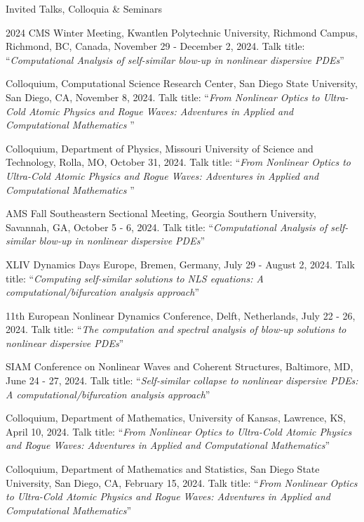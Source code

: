 \documentclass[10pt]{article} %
\begin{document}
\begin{section}{Invited Talks, Colloquia \& Seminars}
\begin{etaremune}
\item 2024 CMS Winter Meeting, Kwantlen Polytechnic University, Richmond Campus, Richmond, BC, Canada, November 29 - December 2, 2024.
Talk title: ``\textit{Computational Analysis of self-similar blow-up in nonlinear dispersive PDEs}''

\item Colloquium, Computational Science Research Center, San Diego State University, San Diego, CA, November 8, 2024.
Talk title: ``\textit{From Nonlinear Optics to Ultra-Cold Atomic Physics and Rogue Waves: Adventures in Applied and Computational Mathematics
}''

\item Colloquium, Department of Physics, Missouri University of Science and Technology, Rolla, MO, October 31, 2024.
Talk title: ``\textit{From Nonlinear Optics to Ultra-Cold Atomic Physics and Rogue Waves: Adventures in Applied and Computational Mathematics
}''

\item AMS Fall Southeastern Sectional Meeting, Georgia Southern University, Savannah, GA, October 5 - 6, 2024.
Talk title: ``\textit{Computational Analysis of self-similar blow-up in nonlinear dispersive PDEs}''

\item XLIV Dynamics Days Europe, Bremen, Germany, July 29 - August 2, 2024.
Talk title: ``\textit{Computing self-similar solutions to NLS equations: A computational/bifurcation analysis approach}''

\item 11th European Nonlinear Dynamics Conference, Delft, Netherlands, July 22 - 26, 2024.
Talk title: ``\textit{The computation and spectral analysis of blow-up solutions to nonlinear dispersive PDEs}''

\item SIAM Conference on Nonlinear Waves and Coherent Structures, Baltimore, MD, June 24 - 27, 2024.
Talk title: ``\textit{Self-similar collapse to nonlinear dispersive PDEs: A computational/bifurcation analysis approach}''

\item Colloquium, Department of Mathematics, University of Kansas, Lawrence, KS, April 10, 2024.
Talk title: ``\textit{From Nonlinear Optics to Ultra-Cold Atomic Physics and Rogue Waves:
Adventures in Applied and Computational Mathematics}''

\item Colloquium, Department of Mathematics and Statistics, San Diego State University, San Diego, CA, February 15, 2024.
Talk title: ``\textit{From Nonlinear Optics to Ultra-Cold Atomic Physics and Rogue Waves:
Adventures in Applied and Computational Mathematics}''


\end{etaremune}
\end{section}
\end{document}
